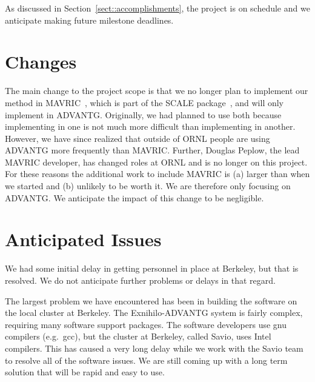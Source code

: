 \documentclass[12pt]{article}
\begin{document}
As discussed in Section~\ref{sect::accomplishments}, the project is on schedule and we anticipate making future milestone deadlines.


\section{Changes}
\label{sect::changes}

The main change to the project scope is that we no longer plan to implement our method in MAVRIC~\cite{peplow_mavric_2011}, which is part of the SCALE package~\cite{SCALE}, and will only implement in ADVANTG. Originally, we had planned to use both because implementing in one is not much more difficult than implementing in another. However, we have since realized that outside of ORNL people are using ADVANTG more frequently than MAVRIC. Further, Douglas Peplow, the lead MAVRIC developer, has changed roles at ORNL and is no longer on this project. For these reasons the additional work to include MAVRIC is (a) larger than when we started and (b) unlikely to be worth it. We are therefore only focusing on ADVANTG. We anticipate the impact of this change to be negligible.


\section{Anticipated Issues}
\label{sect::schedule}

We had some initial delay in getting personnel in place at Berkeley, but that is resolved. We do not anticipate further problems or delays in that regard.

The largest problem we have encountered has been in building the software on the local cluster at Berkeley. The Exnihilo-ADVANTG system is fairly complex, requiring many software support packages. The software developers use gnu compilers (e.g.\ gcc), but the cluster at Berkeley, called Savio, uses Intel compilers. This has caused a very long delay while we work with the Savio team to resolve all of the software issues. We are still coming up with a long term solution that will be rapid and easy to use.
\end{document}
